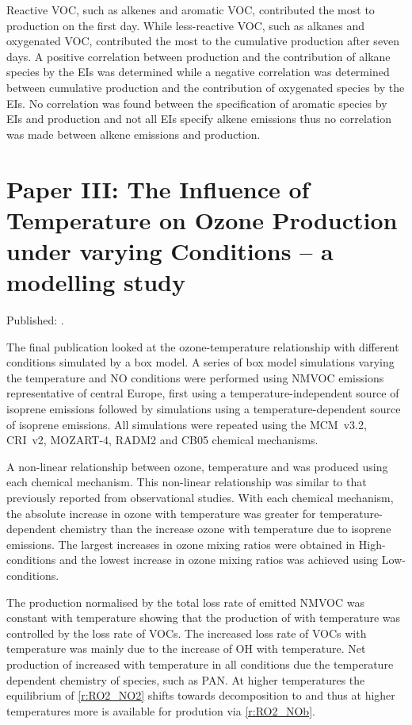 Reactive VOC, such as alkenes and aromatic VOC, contributed the most to  production on the first day.
While less-reactive VOC, such as alkanes and oxygenated VOC, contributed the most to the cumulative  production after seven days.  
A positive correlation between  production and the contribution of alkane species by the EIs was determined while a negative correlation was determined between cumulative  production and the contribution of oxygenated species by the EIs.
No correlation was found between the specification of aromatic species by EIs and  production and not all EIs specify alkene emissions thus no correlation was made between alkene emissions and  production.

\singlespacing
\section[Paper III]{Paper III: The Influence of Temperature on Ozone Production under varying  Conditions -- a modelling study} \label{s:T-O3_results}

\onehalfspacing

\noindent
Published: .

The final publication looked at the ozone-temperature relationship with different  conditions simulated by a box model.
A series of box model simulations varying the temperature and NO conditions were performed using NMVOC emissions representative of central Europe, first using a temperature-independent source of isoprene emissions followed by simulations using a temperature-dependent source of isoprene emissions.
All simulations were repeated using the MCM~v3.2, CRI~v2, MOZART-4, RADM2 and CB05 chemical mechanisms.

A non-linear relationship between ozone, temperature and  was produced using each chemical mechanism. 
This non-linear relationship was similar to that previously reported from observational studies.  
With each chemical mechanism, the absolute increase in ozone with temperature was greater for temperature-dependent chemistry than the increase ozone with temperature due to isoprene emissions.
The largest increases in ozone mixing ratios were obtained in High- conditions and the lowest increase in ozone mixing ratios was achieved using Low- conditions.

The  production normalised by the total loss rate of emitted NMVOC was constant with temperature showing that the production of  with temperature was controlled by the loss rate of VOCs.
The increased loss rate of VOCs with temperature was mainly due to the increase of OH with temperature. 
Net production of  increased with temperature in all  conditions due the temperature dependent chemistry of  species, such as PAN.
At higher temperatures the equilibrium of  \eqref{r:RO2_NO2} shifts towards decomposition to  and  thus at higher temperatures more  is available for  prodution via \eqref{r:RO2_NOb}.

